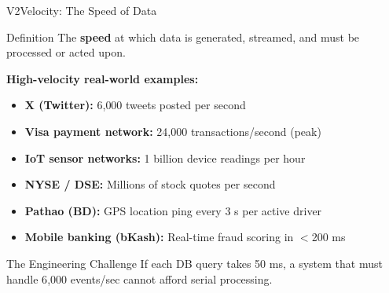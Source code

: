 \documentclass[aspectratio=169,10pt]{beamer}
\begin{document}
\begin{frame}{V2\textemdash Velocity: The Speed of Data}
      \begin{block}{Definition}
        The \textbf{speed} at which data is generated, streamed, and must be processed or acted upon.
      \end{block}
      \vspace{6pt}
      \textbf{High-velocity real-world examples:}
      \begin{itemize}
        \item \textbf{X (Twitter):} 6{,}000 tweets posted per second
        \item \textbf{Visa payment network:} 24{,}000 transactions/second (peak)
        \item \textbf{IoT sensor networks:} 1 billion device readings per hour
        \item \textbf{NYSE / DSE:} Millions of stock quotes per second
        \item \textbf{Pathao (BD):} GPS location ping every 3 s per active driver
        \item \textbf{Mobile banking (bKash):} Real-time fraud scoring in $<$200 ms
      \end{itemize}
      \vspace{4pt}
      \begin{alertblock}{The Engineering Challenge}
        If each DB query takes 50 ms, a system that must handle 6{,}000 events/sec cannot afford serial processing.
      \end{alertblock}


\end{frame}
\end{document}
